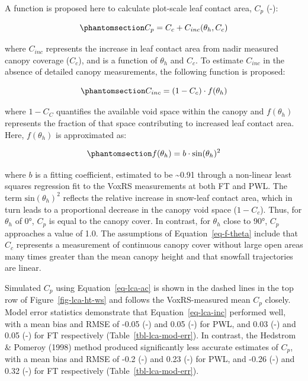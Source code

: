 \documentclass[
  letterpaper,
  DIV=11,
  numbers=noendperiod]{scrartcl}
\begin{document}
A function is proposed here to calculate plot-scale leaf contact area,
\(C_p\) (-):

\begin{equation}\phantomsection\label{eq-lca-ac}{
C_p = C_c + C_{inc}(\theta_h, C_c)
}\end{equation}

where \(C_{inc}\) represents the increase in leaf contact area from
nadir measured canopy coverage (\(C_c\)), and is a function of
\(\theta_h\) and \(C_c\). To estimate \(C_{inc}\) in the absence of
detailed canopy measurements, the following function is proposed:

\begin{equation}\phantomsection\label{eq-lca-inc}{
C_{inc} = (1-C_c)\cdot f(\theta_h)
}\end{equation}

where \(1-C_C\) quantifies the available void space within the canopy
and \(f(\theta_h)\) represents the fraction of that space contributing
to increased leaf contact area. Here, \(f(\theta_h)\) is approximated
as:

\begin{equation}\phantomsection\label{eq-f-theta}{
f(\theta_h) = b \cdot\text{sin}(\theta_h)^2
}\end{equation}

where \(b\) is a fitting coefficient, estimated to be
\textasciitilde0.91 through a non-linear least squares regression fit to
the VoxRS measurements at both FT and PWL. The term
\(\text{sin}(\theta_h)^2\) reflects the relative increase in snow-leaf
contact area, which in turn leads to a proportional decrease in the
canopy void space (\(1-C_c\)). Thus, for \(\theta_h\) of 0°, \(C_p\) is
equal to the canopy cover. In contrast, for \(\theta_h\) close to 90°,
\(C_p\) approaches a value of 1.0. The assumptions of
Equation~\ref{eq-f-theta} include that \(C_c\) represents a measurement
of continuous canopy cover without large open areas many times greater
than the mean canopy height and that snowfall trajectories are linear.

Simulated \(C_p\) using Equation~\ref{eq-lca-ac} is shown in the dashed
lines in the top row of Figure~\ref{fig-lca-ht-ws} and follows the
VoxRS-measured mean \(C_p\) closely. Model error statistics demonstrate
that Equation~\ref{eq-lca-inc} performed well, with a mean bias and RMSE
of -0.05 (-) and 0.05 (-) for PWL, and 0.03 (-) and 0.05 (-) for FT
respectively (Table~\ref{tbl-lca-mod-err}). In contrast, the Hedstrom \&
Pomeroy (1998) method produced significantly less accurate estimates of
\(C_p\), with a mean bias and RMSE of -0.2 (-) and 0.23 (-) for PWL, and
-0.26 (-) and 0.32 (-) for FT respectively
(Table~\ref{tbl-lca-mod-err}).
\end{document}
